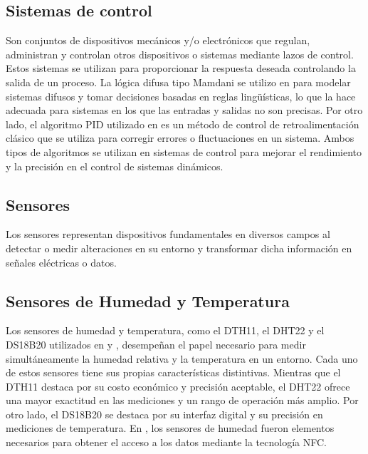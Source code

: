 \subsection{Sistemas de control}
Son conjuntos de dispositivos mecánicos y/o electrónicos que regulan, administran y controlan otros dispositivos o sistemas mediante lazos de control. Estos sistemas se utilizan para proporcionar la respuesta deseada controlando la salida de un proceso. La lógica difusa tipo Mamdani se utilizo en \cite{mohammed_intelligent_nodate} \cite{widyawati_fuzzy_2022} para modelar sistemas difusos y tomar decisiones basadas en reglas lingüísticas, lo que la hace adecuada para sistemas en los que las entradas y salidas no son precisas. Por otro lado, el algoritmo PID utilizado en \cite{haiyan_intelligent_2022} es un método de control de retroalimentación clásico que se utiliza para corregir errores o fluctuaciones en un sistema. Ambos tipos de algoritmos se utilizan en sistemas de control para mejorar el rendimiento y la precisión en el control de sistemas dinámicos.

\subsection{Sensores}
Los sensores representan dispositivos fundamentales en diversos campos al detectar o medir alteraciones en su entorno y transformar dicha información en señales eléctricas o datos.

\subsection*{Sensores de Humedad y Temperatura}
Los sensores de humedad y temperatura, como el DTH11, el DHT22 y el DS18B20 utilizados en \cite{lema_holguin_implementacion_2018} \cite{alcivar_dominguez_sistema_2018} \cite{munir_intelligent_2019} \cite{krishnan_fuzzy_2020} \cite{benyezza_zoning_2021} \cite{widyawati_fuzzy_2022} y \cite{noauthor_fuzzy_2023}, desempeñan el papel necesario para medir simultáneamente la humedad relativa y la temperatura en un entorno. Cada uno de estos sensores tiene sus propias características distintivas. Mientras que el DTH11 destaca por su costo económico y precisión aceptable, el DHT22 ofrece una mayor exactitud en las mediciones y un rango de operación más amplio. Por otro lado, el DS18B20 se destaca por su interfaz digital y su precisión en mediciones de temperatura. En \cite{castillo_herrero_desarrollo_2020}, los sensores de humedad fueron elementos necesarios para obtener el acceso a los datos mediante la tecnología NFC.

